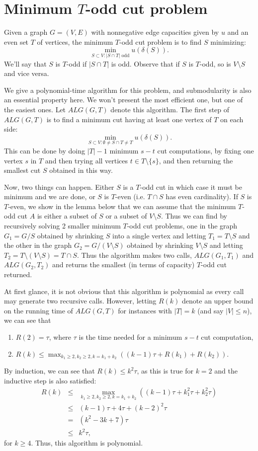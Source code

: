 \documentclass[12pt]{article}
\begin{document}
\section{Minimum $T$-odd cut problem}
Given a graph $G=(V,E)$ with nonnegative edge capacities given by $u$
and an even set $T$ of vertices, the minimum $T$-odd cut problem is to
find $S$ minimizing:
$$\min_{S\subset V: |S\cap T| \mbox{ odd}} u(\delta(S)).$$
We'll say that $S$ is $T$-odd if $|S\cap T|$ is odd. Observe that if
$S$ is $T$-odd, so is $V\setminus S$ and vice versa.  

We  give a polynomial-time algorithm for this problem, and submodularity is also an essential property here. We won't
present the most efficient one, but one of the easiest ones. Let
$ALG(G,T)$ denote this algorithm. The first step of $ALG(G,T)$ is to
find a minimum cut having at least one vertex of $T$ on each side:
$$\min_{S\subset V: \emptyset \neq S\cap T \neq T} u(\delta(S)).$$ This can be done by doing $|T|-1$ minimum $s-t$ cut
computations, by fixing one vertex $s$ in $T$ and then trying all
vertices $t\in T\setminus\{s\}$, and then returning the smallest cut
$S$ obtained in this way.

Now, two things can happen. Either $S$ is a $T$-odd cut in which case
it must be minimum and we are done, or $S$ is $T$-even (i.e. $T\cap S$
has even cardinality). If $S$ is $T$-even, we show in the lemma below
that we can assume that the minimum $T$-odd cut $A$ is either a
subset of $S$ or a subset of $V\setminus S$. Thus we can find by
recursively solving 2 smaller minimum $T$-odd cut problems, one in the
graph $G_1=G/S$ obtained by shrinking $S$ into a single vertex and
letting $T_1=T\setminus S$ and the other in the graph
$G_2=G/(V\setminus S)$ obtained by shrinking $V\setminus S$ and
letting $T_2=T\setminus (V\setminus S)=T\cap S$. Thus the algorithm
makes two calls, $ALG(G_1,T_1)$ and $ALG(G_2,T_2)$ and returns the
smallest (in terms of capacity) $T$-odd cut returned. 

At first glance, it is not obvious that this algorithm is polynomial
as every call may generate two recursive calls. However, letting
$R(k)$ denote an upper bound on the running time of $ALG(G,T)$ for
instances with $|T|=k$ (and say $|V|\leq n$), we can see that 
\begin{enumerate}
\item
$R(2)=\tau$, where $\tau$ is the time needed for a minimum $s-t$ cut
computation,
\item
$R(k) \leq \max_{k_1\geq 2, k_2\geq 2, k=k_1+k_2} \left((k-1)\tau + R(k_1) +
R(k_2)\right).$ 
\end{enumerate}
By induction, we can see that $R(k) \leq k^2 \tau$, as this is true for
$k=2$ and the inductive step is also satisfied: 
\begin{eqnarray*}
R(k) & \leq & \max_{k_1\geq 2, k_2\geq 2, k=k_1+k_2} \left((k-1)\tau +
  k_1^2 \tau+ k_2^2 \tau\right)\\
 & \leq & (k-1)\tau+ 4 \tau + (k-2)^2 \tau \\
& = & (k^2-3k+7) \tau \\
& \leq & k^2 \tau,
\end{eqnarray*} for $k\geq 4$. Thus, this algorithm is polynomial. 
\end{document}
